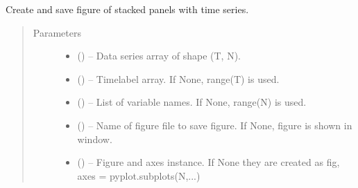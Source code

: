 \documentclass[letterpaper,10pt,english]{sphinxmanual}
\begin{document}

\begin{fulllineitems}
\label{\detokenize{index:tigramite.plotting.plot_timeseries}}
Create and save figure of stacked panels with time series.
\begin{quote}\begin{description}
\item[{Parameters}] \leavevmode\begin{itemize}
\item {} 
 () -- Data series array of shape (T, N).

\item {} 
 (\sphinxstyleliteralemphasis{, }\sphinxstyleliteralemphasis{ (}\sphinxstyleliteralemphasis{)}\sphinxstyleliteralemphasis{}) -- Timelabel array. If None, range(T) is used.

\item {} 
 (\sphinxstyleliteralemphasis{, }\sphinxstyleliteralemphasis{ (}\sphinxstyleliteralemphasis{)}\sphinxstyleliteralemphasis{}) -- List of variable names. If None, range(N) is used.

\item {} 
 (\sphinxstyleliteralemphasis{, }\sphinxstyleliteralemphasis{ (}\sphinxstyleliteralemphasis{)}\sphinxstyleliteralemphasis{}) -- Name of figure file to save figure. If None, figure is shown in window.

\item {} 
 (\sphinxstyleliteralemphasis{, }\sphinxstyleliteralemphasis{ (}\sphinxstyleliteralemphasis{)}\sphinxstyleliteralemphasis{}) -- Figure and axes instance. If None they are created as
fig, axes = pyplot.subplots(N,...)


\end{itemize}
\end{description}
\end{quote}
\end{fulllineitems}
\end{document}
